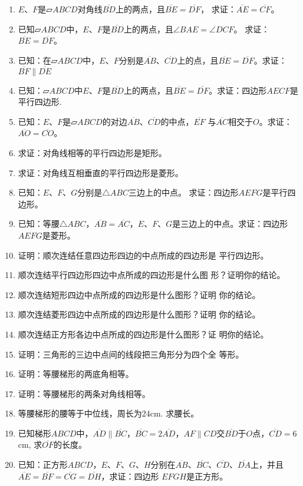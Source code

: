 \begin{Practice}
\begin{enumerate}
    \item $E$、$F$是$\parallelogram ABCD$对角线$\overline{BD}$上的两点，且$\overline{BE}=\overline{DF}$， 求证：$\overline{AE}=\overline{CF}$。
    \item 已知$\parallelogram ABCD$中，$E$、$F$是$\overline{BD}$上的两点，且$\angle BAE=\angle DCF$。 求证：$\overline{BE}=\overline{DF}$。
\item 已知：在$\parallelogram ABCD$中，$E$、$F$分别是$\overline{AB}$、$\overline{CD}$上的点，且$\overline{BE}=\overline{DF}$。求证：$\overline{BF}\parallel\overline{DE}$

\item 已知：$\parallelogram ABCD$中$E$、$F$是$\overline{BD}$上的两点，且$\overline{BE}=\overline{DF}$。求证：四边形$AECF$是平行四边形.
\item 已知：$E$、$F$是$\parallelogram ABCD$的对边$\overline{AB}$、$\overline{CD}$的中点，$\overline{EF}$
与$\overline{AC}$相交于$O$。求证：$\overline{AO}=\overline{CO}$。
\item 求证：对角线相等的平行四边形是矩形。
\item 求证：对角线互相垂直的平行四边形是菱形。
\item 已知：$E$、$F$、$G$分别是$\triangle ABC$三边上的中点。
求证：四边形$AEFG$是平行四边形。
\item 已知：等腰$\triangle ABC$，$\overline{AB}=\overline{AC}$，$E$、$F$、$G$是三边上的中点。求证：四边形$AEFG$是菱形。
    
\item 证明：顺次连结任意四边形四边的中点所成的四边形是
平行四边形。
\item 顺次连结平行四边形四边中点所成的四边形是什么图
形？证明你的结论。
\item 顺次连结短形四边中点所成的四边形是什么图形？证明
你的结论。
\item 顺次连结菱形四边中点所成的四边形是什么图形？证明
你的结论。
\item 顺次连结正方形各边中点所成的四边形是什么图形？证
明你的结论。
\item 证明：三角形的三边中点间的线段把三角形分为四个全
等形。
\item 证明：等腰梯形的两底角相等。
\item 证明：等腰梯形的两条对角线相等。
\item 等腰梯形的腰等于中位线，周长为24cm. 求腰长。
\item 已知梯形$ABCD$中，$\overline{AD}\parallel \overline{BC}$，$\overline{BC}=2\overline{AD}$，$AF\parallel CD$交$\overline{BD}$于$O$点，$\overline{CD}=6$cm, 求$\overline{OF}$的长度。

\item 已知：正方形$ABCD$，$E$、$F$、$G$、$H$分别在$\overline{AB}$、$\overline{BC}$、$\overline{CD}$、$\overline{DA}$上，并且$\overline{AE}=\overline{BF}=\overline{CG}=\overline{DH}$，求证：四边形
$EFGH$是正方形。
\end{enumerate}
\end{Practice}



